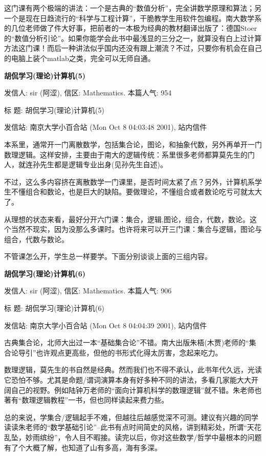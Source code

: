 这门课有两个极端的讲法：一个是古典的“数值分析”，完全讲数学原理和算法；另一个是现在日趋流行的“科学与工程计算”，干脆教学生用软件包编程。南大数学系的几位老师做了件大好事，把前者的一本极为经典的教材翻译出版了：德国Stoer的“数值分析引论”。如果你能学会此书中最浅显的三分之一，就算没有白上过计算方法这门课！而后一种讲法似乎国内还没有跟上潮流？不过，只要你有机会在自己的电脑上装个matlab之类，完全可以无师自通。


\textbf{胡侃学习(理论)计算机(5)}


发信人: sir (阿涩), 信区: Mathematics. 本篇人气: 954

标  题: 胡侃学习(理论)计算机(5)\cite{sir5}

发信站: 南京大学小百合站 (Mon Oct  8 04:03:48 2001), 站内信件


本系里，通常开一门离散数学，包括集合论，图论，和抽象代数，另外再单开一门数理逻辑。这样安排，主要由于南大的逻辑传统：系里很多老师都算莫先生的门人，就连孙先生都是逻辑专业出身(见孙先生自述)。

不过，这么多内容挤在离散数学一门课里，是否时间太紧了点？另外，计算机系学生不懂组合和数论，也是巨大的缺陷。要做理论，不懂组合或者数论吃亏可就太大了。

从理想的状态来看，最好分开六门课：集合，逻辑,图论，组合，代数，数论。这个当然不现实，因为没那么多课时。也许将来可以开三门课：集合与逻辑，图论与组合，代数与数论。

不管课怎么开，学生总一样要学。下面分别谈谈上面的三组内容。


\textbf{胡侃学习(理论)计算机(6)}


发信人: sir (阿涩), 信区: Mathematics. 本篇人气: 906

标  题: 胡侃学习(理论)计算机(6)\cite{sir6}

发信站: 南京大学小百合站 (Mon Oct  8 04:04:39 2001), 站内信件


古典集合论，北师大出过一本“基础集合论”不错。南大出版朱梧(木贾)老师的“集合论导引”也许观点更高些，但他的书形式化得太厉害，念起来吃力。

数理逻辑，莫先生的书自然是经典。然而我们也不得不承认，此书年代久远，光读它恐怕不够。尤其是命题/谓词演算本身有好多种不同的讲法，多看几家能大大开阔自己的视野。例如陆钟万老师的“面向计算机科学的数理逻辑”就不错。朱老师也著有“数理逻辑教程”一书，但也同样读起来费力些。

总的来说，学集合/逻辑起手不难，但越往后越感觉深不可测。建议有兴趣的同学读读朱老师的“数学基础引论”--此书有点时间简史的风格，讲到精彩处，所谓“天花乱坠，妙雨缤纷”，令人目不暇接。读完以后，你对这些数学/哲学中最根本的问题有了个大概了解，也知道了山有多高，海有多深。

